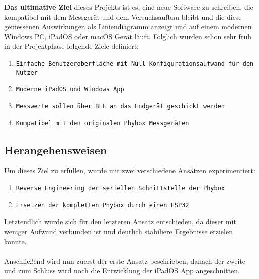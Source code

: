 \textbf{Das ultimative Ziel} dieses Projekts ist es, eine neue Software zu schreiben, die kompatibel mit dem Messgerät und dem Versuchsaufbau bleibt und die diese gemessenen Auswirkungen als Liniendiagramm anzeigt und auf einem modernen Windows \ac{PC}, iPadOS oder macOS Gerät läuft. Folglich wurden schon sehr früh in der Projektphase folgende Ziele definiert:
\begin{enumerate}
    \item \texttt{Einfache Benutzeroberfläche mit Null-Konfigurationsaufwand für den Nutzer}
    \item \texttt{Moderne iPadOS und Windows App}
    \item \texttt{Messwerte sollen über \ac{BLE} an das Endgerät geschickt werden}
    \item \texttt{Kompatibel mit den originalen Phybox Messgeräten}
\end{enumerate}

\subsection{Herangehensweisen}
\label{sec:Herangehensweisen}

Um dieses Ziel zu erfüllen, wurde mit zwei verschiedene Ansätzen experimentiert:
\begin{enumerate}
    \item \texttt{Reverse Engineering der seriellen Schnittstelle der Phybox}
    \item \texttt{Ersetzen der kompletten Phybox durch einen \ac{ESP32}}
\end{enumerate}

Letztendlich wurde sich für den letzteren Ansatz entschieden, da dieser mit weniger Aufwand verbunden ist und deutlich stabiliere Ergebnisse erzielen konnte.\\
\\[2em]
Anschließend wird nun zuerst der erste Ansatz beschrieben, danach der zweite und zum Schluss wird noch die Entwicklung der iPadOS App angeschnitten.
